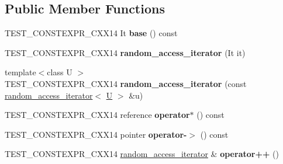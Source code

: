 \subsection*{Public Member Functions}
\begin{DoxyCompactItemize}
\item 
\mbox{\label{classrandom__access__iterator_a48e42be6c253b0fac5d7e82822f2acd7}} 
T\+E\+S\+T\+\_\+\+C\+O\+N\+S\+T\+E\+X\+P\+R\+\_\+\+C\+X\+X14 It {\bfseries base} () const
\item 
\mbox{\label{classrandom__access__iterator_a28fa54c723b3ca324c9ad9e2e52e0933}} 
T\+E\+S\+T\+\_\+\+C\+O\+N\+S\+T\+E\+X\+P\+R\+\_\+\+C\+X\+X14 {\bfseries random\+\_\+access\+\_\+iterator} (It it)
\item 
\mbox{\label{classrandom__access__iterator_a6392f73858191a4a76b1ec06911ef05b}} 
{\footnotesize template$<$class U $>$ }\\T\+E\+S\+T\+\_\+\+C\+O\+N\+S\+T\+E\+X\+P\+R\+\_\+\+C\+X\+X14 {\bfseries random\+\_\+access\+\_\+iterator} (const \mbox{\hyperlink{classrandom__access__iterator}{random\+\_\+access\+\_\+iterator}}$<$ \mbox{\hyperlink{union_u}{U}} $>$ \&u)
\item 
\mbox{\label{classrandom__access__iterator_aa218ca5d1c693bd885840b9097c1591a}} 
T\+E\+S\+T\+\_\+\+C\+O\+N\+S\+T\+E\+X\+P\+R\+\_\+\+C\+X\+X14 reference {\bfseries operator$\ast$} () const
\item 
\mbox{\label{classrandom__access__iterator_a1018576624024915d2db466b5b9d5d5e}} 
T\+E\+S\+T\+\_\+\+C\+O\+N\+S\+T\+E\+X\+P\+R\+\_\+\+C\+X\+X14 pointer {\bfseries operator-\/$>$} () const
\item 
\mbox{\label{classrandom__access__iterator_a9fd2c7a5b017f1949972d24726114b7c}} 
T\+E\+S\+T\+\_\+\+C\+O\+N\+S\+T\+E\+X\+P\+R\+\_\+\+C\+X\+X14 \mbox{\hyperlink{classrandom__access__iterator}{random\+\_\+access\+\_\+iterator}} \& {\bfseries operator++} ()
\item 
\mbox{\label{classrandom__access__iterator_ac859e4355ed749414d6096887ee28a2e}} 

\end{DoxyCompactItemize}
